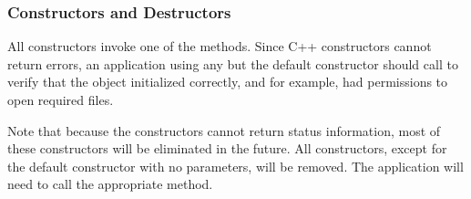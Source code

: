 \subsubsection{Constructors and Destructors}

All  constructors invoke one of the 
methods.
Since C++ constructors cannot return errors, 
an application using any but the default constructor should call
 to verify that the object initialized correctly,
and for example, had permissions to open required files.

Note that because the constructors cannot return status information,
most of these constructors will be eliminated in the future.
All constructors, except for the default constructor with no parameters,
will be removed.
The application will need to call the appropriate  method.

